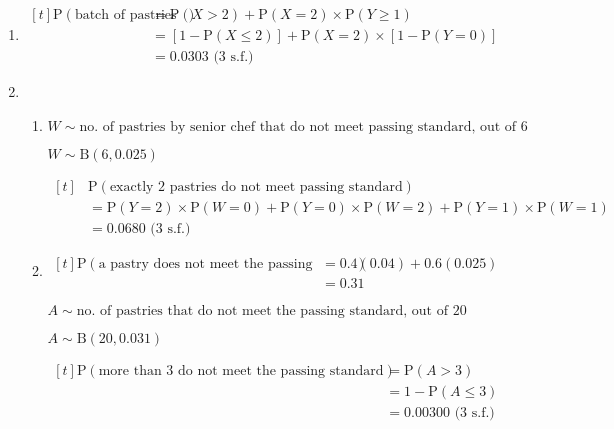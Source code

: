 \documentclass[11pt,a4paper]{book}
\begin{document}
\begin{example}
\begin{enumerate}[label=(\alph*)]
\item
$
\begin{aligned}[t]
\text{P}\left(\text{batch of pastries is rejected}\right) & =\text{P}\left(X>2\right)+\text{P}\left(X=2\right)\times\text{P}\left(Y\geq1\right)\\
 & =\left[1-\text{P}\left(X\leq2\right)\right]+\text{P}\left(X=2\right)\times\left[1-\text{P}\left(Y=0\right)\right]\\
 & =0.0303\text{ (3 s.f.)}
\end{aligned}
$

\item  
\begin{enumerate}[label=(\roman*)]

\item  $W\sim\text{no. of pastries by senior chef that do not meet passing standard, out of 6}$

$W\sim\text{B}\left(6,0.025\right)$

$
\begin{aligned}[t]
 & \text{P}\left(\text{exactly 2 pastries do not meet passing standard}\right)\\
 & =\text{P}\left(Y=2\right)\times\text{P}\left(W=0\right)+\text{P}\left(Y=0\right)\times\text{P}\left(W=2\right)+\text{P}\left(Y=1\right)\times\text{P}\left(W=1\right)\\
 & =0.0680\text{ (3 s.f.)}
\end{aligned}
$

\item
$
\begin{aligned}[t]
\text{P}\left(\text{a pastry does not meet the passing standard}\right) & =0.4\left(0.04\right)+0.6\left(0.025\right)\\
 & =0.31
\end{aligned}
$

$A\sim\text{no. of pastries that do not meet the passing standard, out of 20}$

$A\sim\text{B}\left(20,0.031\right)$

$
\begin{aligned}[t]
\text{P}\left(\text{more than 3 do not meet the passing standard}\right) & =\text{P}\left(A>3\right)\\
 & =1-\text{P}\left(A\leq3\right)\\
 & =0.00300\text{ (3 s.f.)}
\end{aligned}
$

\end{enumerate}

\end{enumerate}

\end{example}
\end{document}
